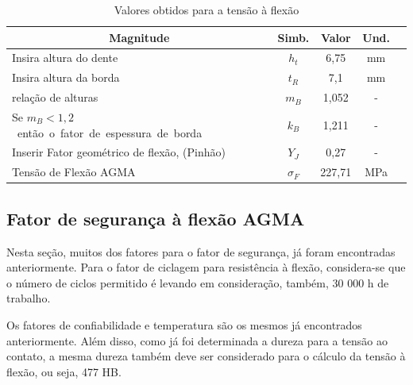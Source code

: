 \documentclass[12pt,a4paper]{article}
\begin{document}
\begin{table}[!htb]
\centering
\caption{{\label{tab:6} Valores obtidos para a tensão à flexão}}
\begin{tabular}{l c c c c}
\hline
\multicolumn{1}{c}{\textbf{Magnitude}}           & \textbf{Simb.} & \textbf{Valor} & \textbf{Und.} \\ \hline
Insira altura do dente                           & $h_t$             & 6,75           & mm            \\
Insira altura da borda                           & $t_R$             & 7,1            & mm            \\
relação de alturas                               & $m_B$             & 1,052          & -             \\
Se $m_B < 1,2$ \ então\ o\ fator\ de\ espessura\ de\ borda & $k_B$             & 1,211          & -             \\
Inserir Fator geométrico de flexão, (Pinhão)      & $Y_J$             & 0,27           & -             \\
Tensão de Flexão AGMA                            & $\sigma_F$       & 227,71         & MPa     \\ \hline    
\end{tabular}
\end{table}

\subsection*{}

{\label{fator-de-seguranuxe7a-uxe0-flexuxe3o-agma}}

\subsection*{Fator de segurança à flexão
AGMA}

{\label{fator-de-seguranuxe7a-uxe0-flexuxe3o-agma}}

Nesta seção, muitos dos fatores para o fator de segurança, já foram
encontradas anteriormente. Para o fator de ciclagem para resistência à
flexão, considera-se que o número de ciclos permitido é levando em
consideração, também, 30 000 h de trabalho.

Os fatores de confiabilidade e temperatura são os mesmos já encontrados
anteriormente. Além disso, como já foi determinada a dureza para a
tensão ao contato, a mesma dureza também deve ser considerado para o
cálculo da tensão à flexão, ou seja, 477 HB.
\end{document}
